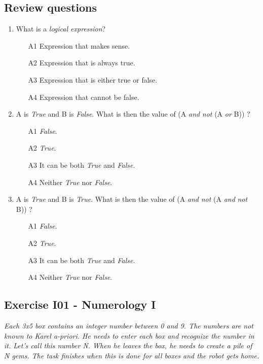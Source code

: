 \documentclass[article,A4,12pt]{llncs}
\begin{document}
{{{{\begin{center}
\end{center}


\subsection{Review questions}

\begin{enumerate}
\item What is a {\em logical expression}? 
\begin{enumerate}
\item[A1] Expression that makes sense.
\item[A2] Expression that is always true. 
\item[A3] Expression that is either true or false.
\item[A4] Expression that cannot be false.
\end{enumerate}
\item A is {\em True} and B is {\em False}. What is then the value of (A {\em and} {\em not} (A {\em or} B)) ?
\begin{enumerate}
\item[A1] {\em False}.
\item[A2] {\em True}.
\item[A3] It can be both {\em True} and {\em False}.
\item[A4] Neither {\em True} nor {\em False}.
\end{enumerate}
\item A is {\em True} and B is {\em True}. What is then the value of (A {\em and} {\em not} (A {\em and} {\em not} B)) ?
\begin{enumerate}
\item[A1] {\em False}.
\item[A2] {\em True}.
\item[A3] It can be both {\em True} and {\em False}.
\item[A4] Neither {\em True} nor {\em False}.
\end{enumerate}
\end{enumerate}

\subsection{Exercise I01 - Numerology I}

{\em Each 3x5 box contains an integer number between 0 and 9. The numbers are not known to Karel a-priori. He needs to enter each box and recognize the number in it. Let's call this number N. When he leaves the box, he needs to create a pile of N gems. The task finishes when this is done for all boxes and the robot gets home.}

}}}}
\end{document}
